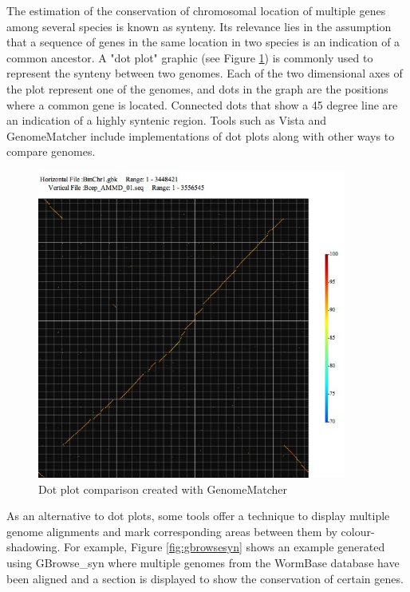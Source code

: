 The estimation of the conservation of chromosomal location of multiple genes among several species is known as synteny. Its relevance lies in the assumption that a sequence of genes in the same location in two species is an indication of a common ancestor. A "dot plot" graphic (see Figure \ref{fig:dotplot}) is commonly used to represent the synteny between two genomes. Each of the two dimensional axes of the plot represent one of the genomes, and dots in the graph are the positions where a common gene is located. Connected dots that show a 45 degree line are an indication of a highly syntenic region. Tools such as Vista \cite{FRA2004} and GenomeMatcher \cite{OHT2008} include implementations of dot plots along with other ways to compare genomes.

\begin{figure}  
\centering
\includegraphics[width=4in]{figures/dotplot.jpg}
\caption[Dot plot comparison created with GenomeMatcher.]{Dot plot comparison created with GenomeMatcher
\label{fig:dotplot}}
\end{figure}

As an alternative to dot plots, some tools offer a technique to display multiple genome alignments and mark corresponding areas between them by colour-shadowing. For example, Figure \ref{fig:gbrowsesyn} shows an example generated using GBrowse\_syn \cite{MCK2010} where multiple genomes from the WormBase database have been aligned and a section is displayed to show the conservation of certain genes.

